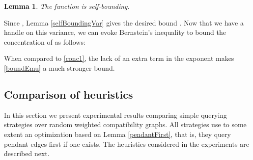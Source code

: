 \documentclass[12pt]{article}
\newtheorem{lemma}{Lemma}
\begin{document}
		\begin{lemma} \label{selfBounding}
			The function  is self-bounding.
		\end{lemma}
		
		Since , Lemma \ref{selfBoundingVar} gives the desired bound . Now that we have a handle on this variance, we can evoke Bernstein's inequality \cite{BoucheronLB03} to bound the concentration of  as follows:

	
	When compared to \eqref{conc1}, the lack of an extra term  in the exponent makes \eqref{boundEmu} a much stronger bound.
						 		

	\subsection{Comparison of heuristics} \label{exp}
		
		In this section we present experimental results comparing simple querying strategies over random weighted compatibility graphs. All strategies use to some extent an optimization based on Lemma \ref{pendantFirst}, that is, they query pendant edges first if one exists. The heuristics considered in the experiments are described next.
		
\end{document}
